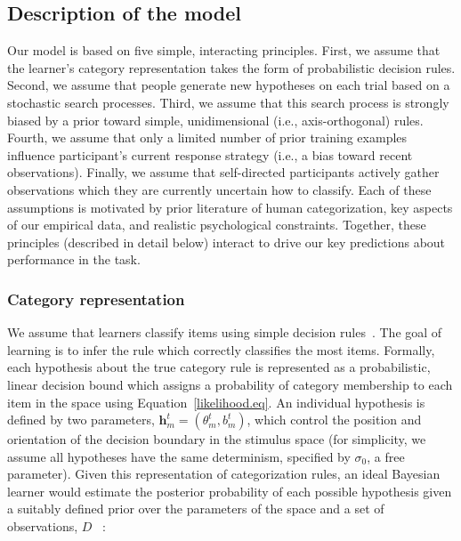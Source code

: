 \documentclass[3p,twocolumn,authoryear,10pt]{elsarticle}
\begin{document}

\subsection{Description of the model}
Our model is based on five simple, interacting principles.  First, we assume that the learner's category representation takes the form of probabilistic decision rules.  Second, we assume that people generate new hypotheses on each trial based on a stochastic search processes.  Third, we assume that this search process is strongly biased by a prior toward simple, unidimensional (i.e., axis-orthogonal) rules.  Fourth, we assume that only a limited number of prior training examples influence participant's current response strategy (i.e., a bias toward recent observations).  Finally, we assume that self-directed participants actively gather observations which they are currently uncertain how to classify.   Each of these assumptions is motivated by prior literature of human categorization, key aspects of our empirical data, and realistic psychological constraints.   Together, these principles (described in detail below) interact to drive our key predictions about performance in the task.

\subsubsection{Category representation}
We assume that learners classify items using simple decision rules~\citep[similar to][]{nosofsky1998rule,Ashby:2010p14184}.
The goal of learning is to infer the rule which correctly classifies the most
items.  Formally, each hypothesis about the true category rule
is represented as a probabilistic, linear decision bound which assigns a probability 
of category membership to each item 
in the space using Equation~\ref{likelihood.eq}.  An individual hypothesis
is defined by two parameters, $\textbf{h}_m^t=(\theta_m^t,b_m^t)$, which control the position and orientation of the decision boundary in the stimulus space (for simplicity, we assume all hypotheses have the same determinism, specified by $\sigma_0$, a free parameter). 
Given this representation of categorization rules, an ideal Bayesian learner
would estimate the posterior probability of each possible hypothesis given a 
suitably defined prior over the parameters of the 
space and a set of observations, $D$ ~\citep[see][for a similar approach]{Courville:2003rm}:
\end{document}
